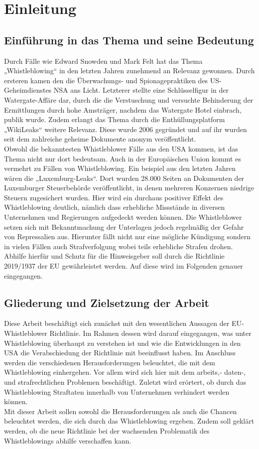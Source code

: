 \section{Einleitung}
\label{sec:Einleitung}

\subsection{Einführung in das Thema und seine Bedeutung}
Durch Fälle wie Edward Snowden und Mark Felt hat das Thema „Whistleblowing“ in den letzten Jahren zunehmend an Relevanz gewonnen.
Durch ersteren kamen den die Überwachungs- und Spionagepraktiken des US-Geheimdienstes NSA ans Licht.
Letzterer stellte eine Schlüsselfigur in der Watergate-Affäre dar, durch die die Verstuschung und versuchte Behinderung der Ermittlungen durch hohe Amsträger, nachdem das Watergate Hotel einbrach, publik wurde.
Zudem erlangt das Thema durch die Enthüllungsplatform „WikiLeaks“ weitere Relevanz.
Diese wurde 2006 gegründet und auf ihr wurden seit dem zahlreiche geheime Dokumente anonym veröffentlicht.\\
Obwohl die bekanntesten Whistleblower Fälle aus den USA kommen, ist das Thema nicht nur dort bedeutsam.
Auch in der Europäischen Union kommt es vermehrt zu Fällen von Whistleblowing.
Ein beispiel aus den letzten Jahren wären die „Luxemburg-Leaks“.
Dort wurden 28.000 Seiten an Dokumenten der Luxemburger Steuerbehörde veröffentlicht, in denen mehreren Konzernen niedrige Steuern zugesichert wurden.
Hier wird ein durchaus positiver Effekt des Whistleblowing deutlich, nämlich dass erhebliche Missstände in diversen Unternehmen und Regierungen aufgedeckt werden können.
Die Whistleblower setzen sich mit Bekanntmachung der Unterlagen jedoch regelmäßig der Gefahr von Repressalien aus.
Hierunter fällt nicht nur eine mögliche Kündigung sondern in vielen Fällen auch Strafverfolgung wobei teils erhebliche Strafen drohen.\\
Abhilfe hierfür und Schutz für die Hinweisgeber soll durch die Richtlinie 2019/1937 der EU gewährleistet werden.
Auf diese wird im Folgenden genauer eingegangen.

\subsection{Gliederung und Zielsetzung der Arbeit}
Diese Arbeit beschäftigt sich zunächst mit den wesentlichen Aussagen der EU-Whistleblower Richtlinie. 
Im Rahmen dessen wird darauf eingegangen, was unter Whistleblowing überhaupt zu verstehen ist und wie die Entwicklungen in den USA die Verabschiedung der Richtlinie mit beeinflusst haben.
Im Anschluss werden die verschiedenen Herausforderungen beleuchtet, die mit dem Whistleblowing einhergehen.
Vor allem wird sich hier mit dem arbeits,- daten-, und strafrechtlichen Problemen beschäftigt.
Zuletzt wird erörtert, ob durch das Whistleblowing Straftaten innerhalb von Unternehmen verhindert werden können.\\
Mit dieser Arbeit sollen sowohl die Herausforderungen als auch die Chancen beleuchtet werden, die sich durch das Whistleblowing ergeben. 
Zudem soll geklärt werden, ob die neue Richtlinie bei der wachsenden Problematik des Whistleblowings abhilfe verschaffen kann.
